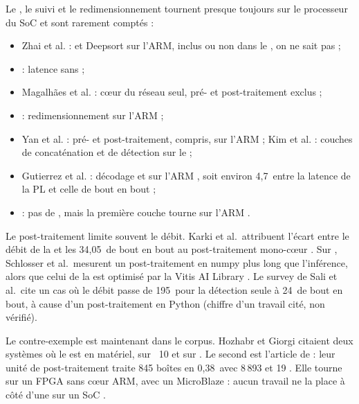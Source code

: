 Le , le suivi et le redimensionnement tournent presque toujours sur le processeur du SoC
et sont rarement comptés :
\begin{itemize}
  \item Zhai et al. :  et Deepsort sur l'ARM, inclus ou non dans le , on ne sait pas
     ;
  \item {} : latence sans   ;
  \item Magalhães et al. : cœur du réseau seul, pré- et post-traitement exclus
     ;
  \item {} : redimensionnement sur l'ARM  ;
  \item Yan et al. : pré- et post-traitement,  compris, sur l'ARM  ; Kim et
    al. : couches de concaténation et de détection sur le   ;
  \item Gutierrez et al. : décodage et  sur l'ARM , soit environ 4,7\,
    entre la latence de la PL et celle de bout en bout  \deduit ;
  \item {} : pas de , mais la première couche tourne sur l'ARM .
\end{itemize}
Le post-traitement limite souvent le débit. Karki et al.\ attribuent l'écart entre le débit
de la  et les 34,05\, de bout en bout au post-traitement mono-cœur . Sur
, Schlosser et al.\ mesurent un post-traitement en numpy plus long que l'inférence,
alors que celui de la  est optimisé par la Vitis AI Library . Le
survey de Sali et al.\ cite un cas où le débit passe de 195\, pour la détection seule
à 24\, de bout en bout, à cause d'un post-traitement en Python  (chiffre d'un
travail cité, non vérifié).

Le contre-exemple est maintenant dans le corpus. Hozhabr et Giorgi citaient deux systèmes
où le  est en matériel, sur ~10 et sur  . Le second est
l'article de \citet{2024-zhang-end-end-acceleration-yolo-object} : leur unité de
post-traitement traite 845 boîtes en 0,38\, avec 8\,893  et 19  .
Elle tourne sur un FPGA sans cœur ARM, avec un MicroBlaze : aucun travail ne la place à
côté d'une  sur un SoC .

